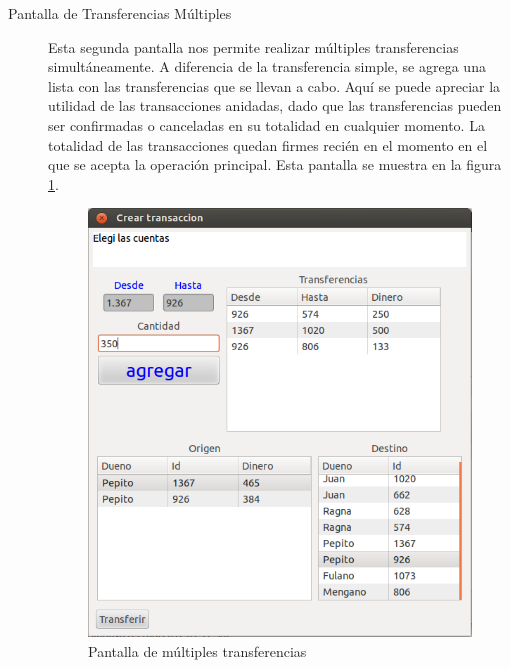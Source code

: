 \begin{description}
		
	\item[Pantalla de Transferencias Múltiples]
		Esta segunda pantalla nos permite realizar múltiples transferencias
		simultáneamente.
		A diferencia de la transferencia simple, se agrega una
		lista con las transferencias que se llevan a cabo.
		Aquí se puede apreciar la utilidad de las transacciones anidadas, dado que
		las transferencias pueden ser confirmadas o canceladas en su totalidad en
		cualquier momento. 
		La totalidad de las transacciones quedan firmes recién en el momento en el 
		que se acepta la operación principal. Esta pantalla se
		muestra en la figura \ref{trasferenciaMultiple}.
	
		\begin{figure}[!h]
			\centering
			\includegraphics[scale=0.5]{img/multTransferencias}
			\caption{Pantalla de múltiples transferencias }
			\label{trasferenciaMultiple}
		\end{figure}
		
\end{description}